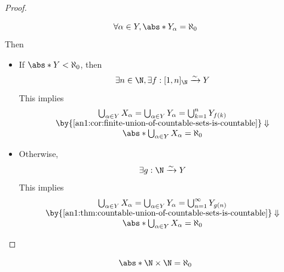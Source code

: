 \begin{proof}
\begin{itemize}
          \[
            \forall \alpha \in Y, \abs*{Y_{\alpha}} = \aleph_{0}
          \]
          Then
          \begin{itemize}
            \item If $\abs*{Y} < \aleph_{0}$, then
                  \[
                    \exists n \in \N, \exists f: [1, n]_{\N} \xrightarrow{\sim} Y
                  \]
                  This implies
                  \[
                    \begin{array}{c}
                      \bigcup_{\alpha \in Y} X_{\alpha} = \bigcup_{\alpha \in Y} Y_{\alpha} = \bigcup_{k = 1}^{n} Y_{f(k)} \\
                      \by{\Cref{an1:cor:finite-union-of-countable-sets-is-countable}} \Downarrow                           \\
                      \abs*{\bigcup_{\alpha \in Y} X_{\alpha}} = \aleph_{0}
                    \end{array}
                  \]
            \item Otherwise,
                  \[
                    \exists g: \N \xrightarrow{\sim} Y
                  \]
                  This implies
                  \[
                    \begin{array}{c}
                      \bigcup_{\alpha \in Y} X_{\alpha} = \bigcup_{\alpha \in Y} Y_{\alpha} = \bigcup_{n = 1}^{\infty} Y_{g(n)} \\
                      \by{\Cref{an1:thm:countable-union-of-countable-sets-is-countable}} \Downarrow                             \\
                      \abs*{\bigcup_{\alpha \in Y} X_{\alpha}} = \aleph_{0}
                    \end{array}
                  \]
          \end{itemize}
  \end{itemize}
\end{proof}

\begin{lemma} \label{an1:lem:N-times-N-is-countable}
  \[
    \abs*{\N \times \N} = \aleph_{0}
  \]
\end{lemma}
